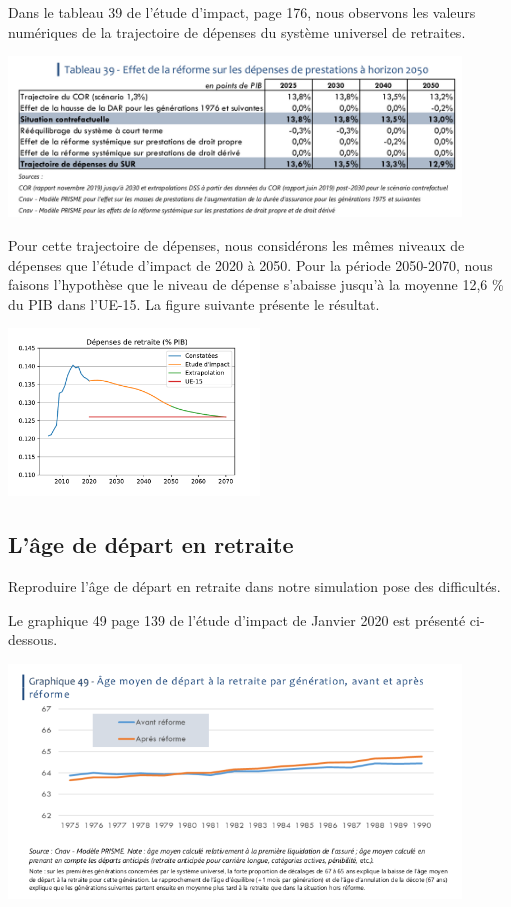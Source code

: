 \documentclass[10pt]{article}
\begin{document}
Dans le tableau 39 de l'étude d'impact, page 176, nous observons les valeurs numériques de la trajectoire de dépenses du système universel de retraites. 

\begin{center}
\includegraphics[width=0.9\textwidth]{EtudeImpact-Depenses-SUR.png}
\end{center}

Pour cette trajectoire de dépenses, nous considérons les mêmes 
niveaux de dépenses que l'étude d'impact de 2020 à 2050. 
Pour la période 2050-2070, nous faisons l'hypothèse que le niveau 
de dépense s'abaisse jusqu'à la moyenne 12,6 \% du PIB dans l’UE-15. 
La figure suivante présente le résultat. 

\begin{center}
\includegraphics[width=0.5\textwidth]{Simulation-Depenses.pdf}
\end{center}


\subsection{L'âge de départ en retraite}

Reproduire l'âge de départ en retraite dans notre simulation 
pose des difficultés. 

Le graphique 49 page 139 de l'étude d'impact de Janvier 2020 est présenté ci-dessous.

\begin{center}
\includegraphics[width=0.9\textwidth]{EtudeImpact-AgeDepartRetraite.png}
\end{center}
\end{document}
